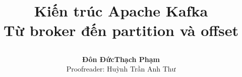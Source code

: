 
\title{\parbox[c][\TitleBlockHeight][c]{0.90\textwidth}{\centering\fontsize{20pt}{24pt}\selectfont\bfseries Kiến trúc Apache Kafka \\ Từ broker đến partition và offset}}
\author{{\normalsize\bfseries Đôn Đức\hspace{3em}Thạch Phạm}\\[0.2em]
  Proofreader: Huỳnh Trần Anh Thư}

\maketitle
\thispagestyle{firstpage}


